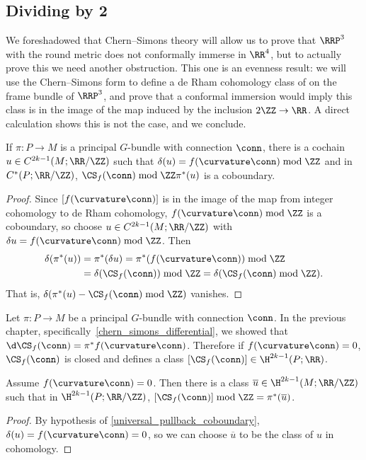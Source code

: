 \subsection{Dividing by \texorpdfstring{2}{$2$}}
\label{ssec:div2}
We foreshadowed that Chern--Simons theory will allow us to prove that $\RRP^3$ with the round metric does not
conformally immerse in $\RR^4$, but to actually prove this we need another obstruction. This one is an evenness
result: we will use the Chern--Simons form to define a de Rham cohomology class of on the frame bundle of $\RRP^3$,
and prove that a conformal immersion would imply this class is in the image of the map induced by the inclusion
$2\ZZ\to\RR$. A direct calculation shows this is not the case, and we conclude.
\begin{lem}[{\cite[Proposition 3.15]{cs}}]
\label{universal_pullback_coboundary}
If $\pi\colon P\to M$ is a principal $G$-bundle with connection $\conn$,
there is a cochain $u\in C^{2k-1}(M; \RR/\ZZ)$ such that $\delta(u) = f(\curvature\conn)\bmod\ZZ$ and in
$C^*(P; \RR/\ZZ)$, $\CS_f(\conn)\bmod\ZZ \pi^*(u)$ is a coboundary.
\end{lem}
\begin{proof}
Since $[f(\curvature\conn)]$ is in the image of the map from integer cohomology to de Rham cohomology,
$f(\curvature\conn)\bmod\ZZ$ is a coboundary, so choose $u\in C^{2k-1}(M; \RR/\ZZ)$ with $\delta u =
f(\curvature\conn)\bmod\ZZ$. Then
\begin{align*}
	\delta(\pi^*(u)) &= \pi^*(\delta u) = \pi^*(f(\curvature\conn))\bmod\ZZ\\
		&= \delta(\CS_f(\conn))\bmod\ZZ = \delta(\CS_f(\conn)\bmod\ZZ).
\end{align*}
That is, $\delta(\pi^*(u) - \CS_f(\conn)\bmod\ZZ)$ vanishes.
\end{proof}
Let $\pi\colon P\to M$ be a principal $G$-bundle with connection $\conn$. In the previous chapter,
specifically~\eqref{chern_simons_differential}, we showed that
$\d\CS_f(\conn) = \pi^*f(\curvature\conn)$. Therefore if $f(\curvature\conn) = 0$, $\CS_f(\conn)$ is
closed and defines a class $[\CS_f(\conn)]\in \H^{2k-1}(P;\RR)$.
\begin{cor}[{\cite[Theorem 3.16]{cs}}]
\label{when_CS_is_pulledback}
Assume $f(\curvature\conn) = 0$. Then there is a class $\overline u\in \H^{2k-1}(M;\RR/\ZZ)$ such that in
$\H^{2k-1}(P;\RR/\ZZ)$, $[\CS_f(\conn)] \bmod \ZZ = \pi^*(\overline u)$.
\end{cor}
\begin{proof}
By hypothesis of \cref{universal_pullback_coboundary}, $\delta(u) = f(\curvature\conn) = 0$, so we can choose
$\overline u$ to be the class of $u$ in cohomology.
\end{proof}
